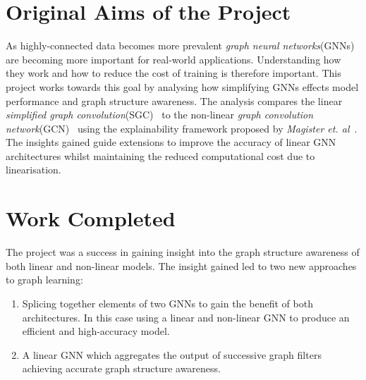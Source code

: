 \documentclass[12pt,a4paper,openany,openright]{report}
\begin{document}

\section*{Original Aims of the Project}

As highly-connected data becomes more prevalent \emph{graph neural networks}(GNNs) are becoming more important for real-world applications. 
Understanding how they work and how to reduce the cost of training is therefore important.
This project works towards this goal by analysing how simplifying GNNs effects model performance and graph structure awareness.
The analysis compares the linear \emph{simplified graph convolution}(SGC)~\cite{wu2019simplifying} to the non-linear \emph{graph convolution network}(GCN)~\cite{kipf2016semi} using the explainability framework proposed by \textit{Magister et. al}~\cite{magister2021gcexplainer}.
The insights gained guide extensions to improve the accuracy of linear GNN architectures whilst maintaining the reduced computational cost due to linearisation.

\section*{Work Completed}

The project was a success in gaining insight into the graph structure awareness of both linear and non-linear models.
The insight gained led to two new approaches to graph learning:

\begin{enumerate}[nolistsep]
    \item Splicing together elements of two GNNs to gain the benefit of both architectures. In this case using a linear and non-linear GNN to produce an efficient and high-accuracy model.
    \item A linear GNN which aggregates the output of successive graph filters achieving accurate graph structure awareness.
\end{enumerate}
\end{document}
